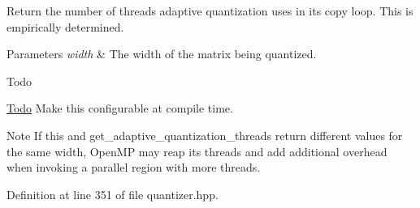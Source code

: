 Return the number of threads adaptive quantization uses in its copy loop. This is empirically determined. 
\begin{DoxyParams}{Parameters}
{\em width} & The width of the matrix being quantized. \\
\hline
\end{DoxyParams}
\begin{DoxyRefDesc}{Todo}
\item[\hyperlink{todo__todo000029}{Todo}]Make this configurable at compile time. \end{DoxyRefDesc}
\begin{DoxyNote}{Note}
If this and get\+\_\+adaptive\+\_\+quantization\+\_\+threads return different values for the same width, Open\+MP may reap its threads and add additional overhead when invoking a parallel region with more threads. 
\end{DoxyNote}


Definition at line 351 of file quantizer.\+hpp.


